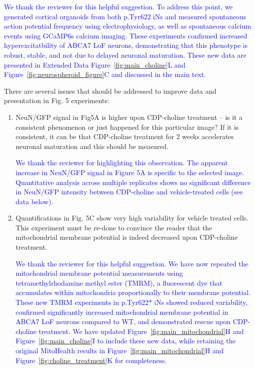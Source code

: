 \textcolor{blue}{We thank the reviewer for this helpful suggestion. To address this point, we generated cortical organoids from both p.Tyr622 iNs and measured spontaneous action potential frequency using electrophysiology, as well as spontaneous calcium events using GCaMP6s calcium imaging. These experiments confirmed increased hyperexcitatbility of ABCA7 LoF neurons, demonstrating that this phenotype is robust, stable, and not due to delayed neuronal maturation. These new data are presented in Extended Data Figure~\ref{fig:main_choline}L and Figure~\ref{fig:neurospheroid_figure}C and discussed in the main text.}

There are several issues that should be addressed to improve data and presentation in Fig. 5 experiments:
\begin{enumerate}
	\item NeuN/GFP signal in Fig5A is higher upon CDP-choline treatment – is it a consistent phenomenon or just happened for this particular image? If it is consistent, it can be that CDP-choline treatment for 2 weeks accelerates neuronal maturation and this should be measured.

	\textcolor{blue}{We thank the reviewer for highlighting this observation. The apparent increase in NeuN/GFP signal in Figure 5A is specific to the selected image. Quantitative analysis across multiple replicates shows no significant difference in NeuN/GFP intensity between CDP-choline and vehicle-treated cells (see data below).}

	\item Quantifications in Fig. 5C show very high variability for vehicle treated cells. This experiment must be re-done to convince the reader that the mitochondrial membrane potential is indeed decreased upon CDP-choline treatment.
	
	\textcolor{blue}{We thank the reviewer for this helpful suggestion. We have now repeated the mitochondrial membrane potential measurements using tetramethylrhodamine methyl ester (TMRM), a fluorescent dye that accumulates within mitochondria proportionally to their membrane potential. These new TMRM experiments in p.Tyr622* iNs showed reduced variability, confirmed significantly increased mitochondrial membrane potential in ABCA7 LoF neurons compared to WT, and demonstrated rescue upon CDP-choline treatment. We have updated Figure~\ref{fig:main_mitochondrial}H and Figure~\ref{fig:main_choline}I to include these new data, while retaining the original MitoHealth results in Figure~\ref{fig:main_mitochondrial}H and Figure~\ref{fig:choline_treatment}K for completeness.}


\end{enumerate}
